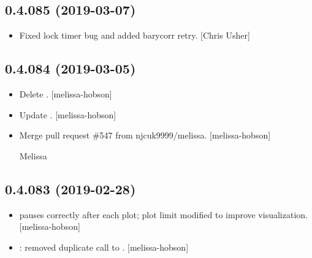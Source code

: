\documentclass[a4paper,10pt,english]{report}
\begin{document}
\subsection{0.4.085 (2019-03-07)}
\label{\detokenize{misc/changelog:id176}}\begin{itemize}
\item {} 
Fixed lock timer bug and added barycorr retry. {[}Chris Usher{]}

\end{itemize}


\subsection{0.4.084 (2019-03-05)}
\label{\detokenize{misc/changelog:id177}}\begin{itemize}
\item {} 
Delete . {[}melissa-hobson{]}

\item {} 
Update . {[}melissa-hobson{]}

\item {} 
Merge pull request \#547 from njcuk9999/melissa. {[}melissa-hobson{]}

Melissa

\end{itemize}


\subsection{0.4.083 (2019-02-28)}
\label{\detokenize{misc/changelog:id178}}\begin{itemize}
\item {} 
 pauses correctly after each plot;
plot limit modified to improve visualization. {[}melissa-hobson{]}

\item {} 
: removed
duplicate call to . {[}melissa-hobson{]}

\end{itemize}
\end{document}

